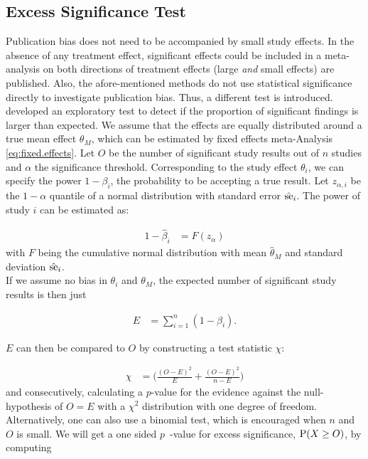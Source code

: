 \documentclass[11pt,a4paper,twoside]{book}\usepackage[]{graphicx}\usepackage[]{color}
\begin{document}
\subsection{Excess Significance Test} \label{sec:excess.significance}
Publication bias does not need to be accompanied by small study effects. In the absence of any treatment effect, significant effects could be included in a meta-analysis on both directions of treatment effects (\ie large \textit{and} small effects) are published. Also, the afore-mentioned methods do not use statistical significance directly to investigate publication bias. Thus, a different test is introduced. \\
\citet{excess.significance} developed an exploratory test to detect if the proportion of significant findings is larger than expected. 
We assume that the effects are equally distributed around a true mean effect $\theta_M$, which can be estimated by fixed effects meta-Analysis \eqref{eq:fixed.effects}. Let $O$ be the number of significant study results out of $n$ studies and $\alpha$ the significance threshold. Corresponding to the study effect $\theta_i$, we can specify the power $1 - \beta_i$, the probability to be accepting a true result. Let $z_{\alpha,i}$ be the $1-\alpha$ quantile of a normal distribution with standard error $\hat{\se}_i$. The power of study $i$ can be estimated as:

\begin{align}
1 - \hat{\beta}_i &= F(z_\alpha) 
\end{align}
with $F$ being the cumulative normal distribution with mean $\hat{\theta}_M$ and standard deviation $\hat{\se}_i$. \\
If we assume no bias in $\theta_i$ and $\theta_M$, the expected number of significant study results is then just

\begin{align}
E &= \sum_{i = 1}^n (1 - \beta_i). \nonumber
\end{align}

$E$ can then be compared to $O$ by constructing a test statistic $\chi$:

\begin{align}
\chi  &= \bigg( \frac{(O - E)^2}{E} + \frac{(O - E)^2}{n - E}\bigg) \nonumber
\end{align}
and consecutively, calculating a $p$\hspace{0.4mm}-value for the evidence against the null-hypothesis of $O = E$ with a $\chi^2$ distribution with one degree of freedom. Alternatively, one can also use a binomial test, which is encouraged when $n$ and $O$ is small. We will get a one sided $p$\hspace{0.4mm}~-value for excess significance, $\P(X \geq O)$, by computing
\end{document}
